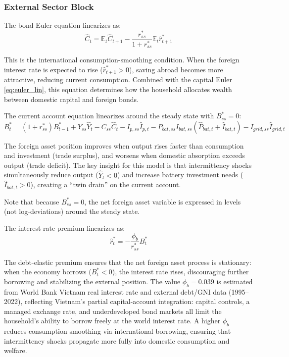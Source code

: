 \documentclass[12pt, a4paper]{article}
\begin{document}
\subsubsection{External Sector Block}

The bond Euler equation linearizes as:
\begin{equation}
\hat{C}_t = \mathbb{E}_t \hat{C}_{t+1} - \frac{r^*_{ss}}{1+r^*_{ss}} \mathbb{E}_t \hat{r}^*_{t+1}
\label{eq:bond_euler_lin}
\end{equation}

This is the international consumption-smoothing condition. When the foreign interest rate is expected to rise ($\hat{r}^*_{t+1} > 0$), saving abroad becomes more attractive, reducing current consumption. Combined with the capital Euler \eqref{eq:euler_lin}, this equation determines how the household allocates wealth between domestic capital and foreign bonds.

The current account equation linearizes around the steady state with $B^*_{ss} = 0$:
\begin{equation}
B^*_t = (1 + r^*_{ss}) B^*_{t-1} + Y_{ss}\hat{Y}_t - C_{ss}\hat{C}_t - I_{p,ss}\hat{I}_{p,t} - P_{bat,ss}I_{bat,ss}(\hat{P}_{bat,t} + \hat{I}_{bat,t}) - I_{grid,ss}\hat{I}_{grid,t}
\label{eq:ca_lin}
\end{equation}

The foreign asset position improves when output rises faster than consumption and investment (trade surplus), and worsens when domestic absorption exceeds output (trade deficit). The key insight for this model is that intermittency shocks simultaneously reduce output ($\hat{Y}_t < 0$) and increase battery investment needs ($\hat{I}_{bat,t} > 0$), creating a ``twin drain'' on the current account.

Note that because $B^*_{ss} = 0$, the net foreign asset variable is expressed in levels (not log-deviations) around the steady state.

The interest rate premium linearizes as:
\begin{equation}
\hat{r}^*_t = -\frac{\phi_b}{r^*_{ss}} B^*_t
\label{eq:premium_lin}
\end{equation}

The debt-elastic premium ensures that the net foreign asset process is stationary: when the economy borrows ($B^*_t < 0$), the interest rate rises, discouraging further borrowing and stabilizing the external position. The value $\phi_b = 0.039$ is estimated from World Bank Vietnam real interest rate and external debt/GNI data (1995--2022), reflecting Vietnam's partial capital-account integration: capital controls, a managed exchange rate, and underdeveloped bond markets all limit the household's ability to borrow freely at the world interest rate. A higher $\phi_b$ reduces consumption smoothing via international borrowing, ensuring that intermittency shocks propagate more fully into domestic consumption and welfare.
\end{document}
